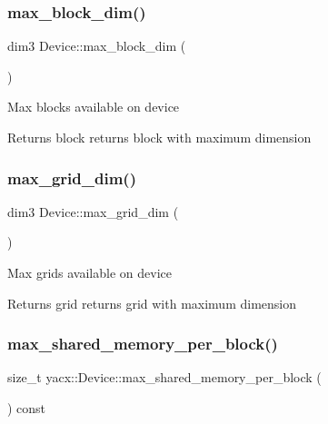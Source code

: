 \subsubsection{\texorpdfstring{max\+\_\+block\+\_\+dim()}{max\_block\_dim()}}
{\footnotesize\ttfamily dim3 Device\+::max\+\_\+block\+\_\+dim (\begin{DoxyParamCaption}{ }\end{DoxyParamCaption})}

Max blocks available on device \begin{DoxyReturn}{Returns}
block returns block with maximum dimension 
\end{DoxyReturn}
\mbox{\label{classyacx_1_1_device_a28355cb20ff6755dd958082540013600}} 
\subsubsection{\texorpdfstring{max\+\_\+grid\+\_\+dim()}{max\_grid\_dim()}}
{\footnotesize\ttfamily dim3 Device\+::max\+\_\+grid\+\_\+dim (\begin{DoxyParamCaption}{ }\end{DoxyParamCaption})}

Max grids available on device \begin{DoxyReturn}{Returns}
grid returns grid with maximum dimension 
\end{DoxyReturn}
\mbox{\label{classyacx_1_1_device_a76378cc2e3f33e4c714296843236be4b}} 
\subsubsection{\texorpdfstring{max\+\_\+shared\+\_\+memory\+\_\+per\+\_\+block()}{max\_shared\_memory\_per\_block()}}
{\footnotesize\ttfamily size\+\_\+t yacx\+::\+Device\+::max\+\_\+shared\+\_\+memory\+\_\+per\+\_\+block (\begin{DoxyParamCaption}{ }\end{DoxyParamCaption}) const\hspace{0.3cm}{\ttfamily [inline]}}

